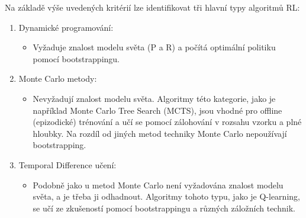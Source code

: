 Na základě výše uvedených kritérií lze identifikovat tři hlavní typy algoritmů RL:
\begin{enumerate}
	\item Dynamické programování:
	\begin{itemize}
		\item Vyžaduje znalost modelu světa (P a R) a počítá optimální politiku pomocí bootstrappingu. 
	\end{itemize} 
	\item Monte Carlo metody:
	\begin{itemize}
		\item Nevyžadují znalost modelu světa. Algoritmy této kategorie, jako je například Monte Carlo Tree Search (MCTS), jsou vhodné pro offline (epizodické) trénování a učí se pomocí zálohování v rozsahu vzorku a plné hloubky. Na rozdíl od jiných metod techniky Monte Carlo nepoužívají bootstrapping.
	\end{itemize}
	\item Temporal Difference učení:
	\begin{itemize}
		\item Podobně jako u metod Monte Carlo není vyžadována znalost modelu světa, a je třeba ji odhadnout. Algoritmy tohoto typu, jako je Q-learning, se učí ze zkušeností pomocí bootstrappingu a různých záložních technik.
	\end{itemize}
\end{enumerate}